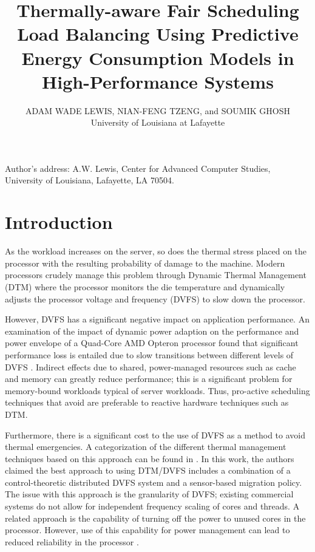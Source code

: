 \documentclass[acmtaco]{acmtrans2m}
\title{Thermally-aware Fair Scheduling Load Balancing Using Predictive Energy
  Consumption Models in High-Performance Systems}
\author{ADAM WADE LEWIS, NIAN-FENG TZENG, and SOUMIK GHOSH\\ University
  of Louisiana at Lafayette }
\begin{document}
\setcounter{page}{1}
\begin{bottomstuff}
Author's address: A.W. Lewis, Center for Advanced Computer Studies,
University of Louisiana, Lafayette, LA 70504.\newline 
\end{bottomstuff}
\maketitle

\section{Introduction}
\label{sec:Introduction}
As the workload increases on the server, so does the thermal stress
placed on the processor with the resulting probability of damage to the
machine.  Modern processors crudely manage this problem through Dynamic
Thermal Management (DTM) where the processor monitors the die
temperature and dynamically adjusts the processor voltage and frequency
(DVFS) to slow down the processor.  

However, DVFS has a significant negative impact on application
performance. An examination of the impact of dynamic power adaption on
the performance and power envelope of a Quad-Core AMD Opteron processor
found that significant performance loss is entailed due to slow
transitions between different levels of DVFS
\cite{Bircher2008}. Indirect effects due to shared, power-managed
resources such as cache and memory can greatly reduce performance; this
is a significant problem for memory-bound workloads typical of server
workloads. Thus, pro-active scheduling techniques that avoid are
preferable to reactive hardware techniques such as DTM.

Furthermore, there is a significant cost to the use of DVFS as a method
to avoid thermal emergencies.      A categorization of the different thermal
management techniques based on this approach can be found in
\cite{Donald2006}.  In this work, the authors claimed the best approach
to using DTM/DVFS includes a combination of a control-theoretic
distributed DVFS system and a sensor-based migration policy.  The issue
with this approach is the granularity of DVFS; existing commercial
systems do not allow for independent frequency scaling of cores and
threads.  A related approach is the capability of turning off the power
to unused cores in the processor.  However, use of this capability for
power management can lead to reduced reliability in the processor
\cite{Rosing2007}\cite{Coskun2008d}.
\end{document}
